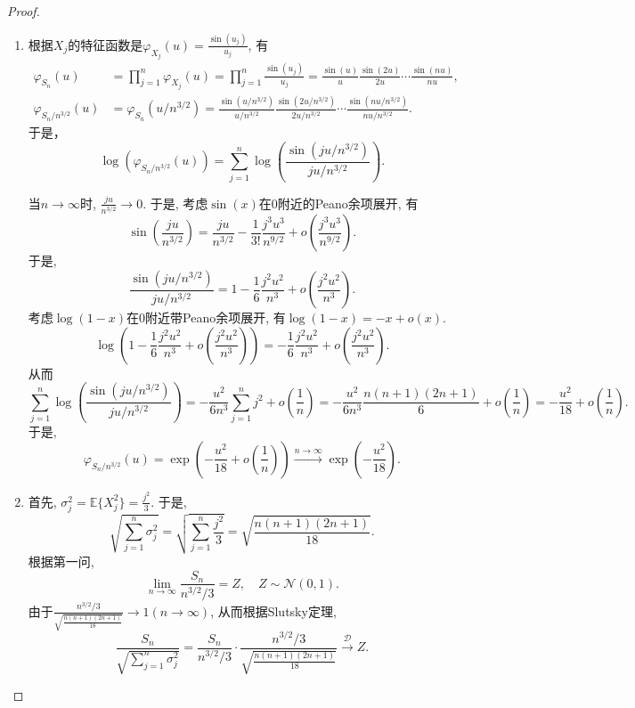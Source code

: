 \documentclass[UTF8, a4paper]{article}
\begin{document}
\begin{proof}
\begin{enumerate}
    \item 根据\(X_j\)的特征函数是\(\varphi_{X_j}(u) = \frac{\sin(u_j)}{u_j}\), 有
    \begin{align*}
        \varphi_{S_n}(u) &= \prod_{j=1}^{n}\varphi_{X_j}(u) = \prod_{j=1}^{n}\frac{\sin(u_j)}{u_j} = \frac{\sin(u)}{u} \frac{\sin(2u)}{2u} \cdots \frac{\sin(nu)}{nu} ,\\
        \varphi_{S_n/n^{3/2}}(u) &= \varphi_{S_n}(u/n^{3/2}) = \frac{\sin(u/n^{3/2})}{u/n^{3/2}} \frac{\sin(2u/n^{3/2})}{2u/n^{3/2}} \cdots \frac{\sin(nu/n^{3/2})}{nu/n^{3/2} }.
    \end{align*}
    于是， 
    $$
    \log(\varphi_{S_n/n^{3/2}}(u)) = \sum_{j=1}^{n}\log\left(\frac{\sin(ju/n^{3/2})}{ju/n^{3/2}}\right) .
    $$
    
    当\(n\to \infty\)时, \(\frac{ju}{n^{3/2}} \to 0\). 于是, 考虑\(\sin(x)\)在\(0\)附近的Peano余项展开, 有
    $$
    \sin\left(\frac{ju}{n^{3/2}}\right) = \frac{ju}{n^{3/2}} - \frac{1}{3!} \frac{j^3 u^3}{n^{9/2}} + o\left(\frac{j^3 u^3}{n^{9/2}}\right).
    $$
    于是, 
    $$
    \frac{\sin(ju/n^{3/2})}{ju/n^{3/2}} = 1 - \frac{1}{6} \frac{j^2u^2}{n^3} + o\left(\frac{j^2u^2}{n^3}\right).
    $$
    考虑\(\log(1 - x)\)在\(0\)附近带Peano余项展开, 有\(\log(1 - x) = -x + o(x)\).
    $$
    \log\left(1 - \frac{1}{6} \frac{j^2u^2}{n^3} + o\left(\frac{j^2u^2}{n^3}\right)\right) = - \frac{1}{6} \frac{j^2u^2}{n^3} + o\left(\frac{j^2u^2}{n^3}\right).
    $$
    从而 
    $$
    \sum_{j=1}^{n}\log\left(\frac{\sin(ju/n^{3/2})}{ju/n^{3/2}}\right) = -\frac{u^2}{6n^3} \sum_{j=1}^{n}j^2 + o\left(\frac{1}{n}\right) = -\frac{u^2}{6n^3} \frac{n(n+1)(2n+1)}{6} + o\left(\frac{1}{n}\right)= -\frac{u^2}{18} + o\left(\frac{1}{n}\right).
    $$
    于是,
    $$
    \varphi_{S_n/n^{3/2}}(u) = \exp\left(-\frac{u^2}{18} + o\left(\frac{1}{n}\right)\right) \xrightarrow{n\to \infty} \exp\left(-\frac{u^2}{18}\right).
    $$
    \item 首先, \(\sigma_j^2 = \mathbb{E}\{X_j^2\} = \frac{j^2}{3}\).
    于是, $$
    \sqrt{\sum_{j=1}^{n}\sigma_j^2} = \sqrt{\sum_{j=1}^{n}\frac{j^2}{3}} = \sqrt{\frac{n(n+1)(2n+1)}{18}}.
    $$
    根据第一问, 
    $$
    \lim_{n\to\infty}\frac{S_n}{n^{3/2}/3} = Z, \quad Z \sim \mathcal{N}(0, 1).
    $$
    由于\(\frac{n^{3/2}/3}{\sqrt{\frac{n(n+1)(2n+1)}{18}}} \to 1 (n\to \infty)\),
    从而根据Slutsky定理, 
    $$
    \frac{S_n}{\sqrt{\sum_{j=1}^n\sigma_j^2}} = \frac{S_n}{n^{3/2}/3} \cdot \frac{n^{3/2}/3}{\sqrt{\frac{n(n+1)(2n+1)}{18}}} \xrightarrow{\mathcal{D}} Z.
    $$
\end{enumerate}
\end{proof}
\end{document}

